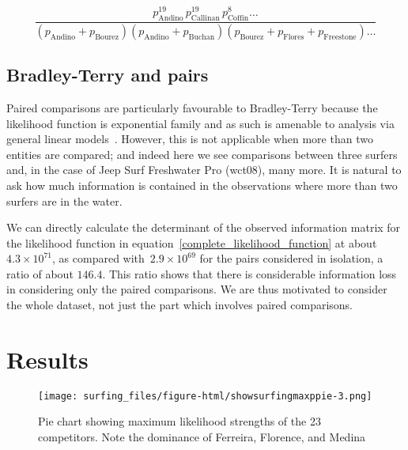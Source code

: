 \documentclass{article}
\begin{document}
\begin{equation}\label{complete_likelihood_function}
\frac{
p_\mathrm{Andino}^{19}\, p_\mathrm{Callinan}^{19}\, p_\mathrm{Coffin}^{8}\ldots
}{
(p_\mathrm{Andino} + p_\mathrm{Bourez})  (p_\mathrm{Andino} + p_\mathrm{Buchan})(p_\mathrm{Bourez} + p_\mathrm{Flores} + p_\mathrm{Freestone})\ldots
}
\end{equation}



\subsection{Bradley-Terry and pairs}

Paired comparisons are particularly favourable to Bradley-Terry
because the likelihood function is exponential family and as such is
amenable to analysis via general linear models~\cite{turner2012}.
However, this is not applicable when more than two entities are
compared; and indeed here we see comparisons between three surfers
and, in the case of Jeep Surf Freshwater Pro (wct08), many more.  It
is natural to ask how much information is contained in the
observations where more than two surfers are in the water.

We can directly calculate the determinant of the observed information
matrix for the likelihood function in
equation~\ref{complete_likelihood_function} at about $4.3\times
10^{71}$, as compared with~$2.9\times 10^{69}$ for the pairs
considered in isolation, a ratio of about $146.4$.  This ratio shows
that there is considerable information loss in considering only the
paired comparisons.  We are thus motivated to consider the whole
dataset, not just the part which involves paired comparisons.

\section{Results}
\begin{figure}
\texttt{[image: surfing\_files/figure-html/showsurfingmaxppie-3.png]} %
\caption{Pie chart\label{piechartmax} showing maximum likelihood strengths of the 23 competitors.  Note the
dominance of Ferreira, Florence, and Medina}
\end{figure}
\end{document}

